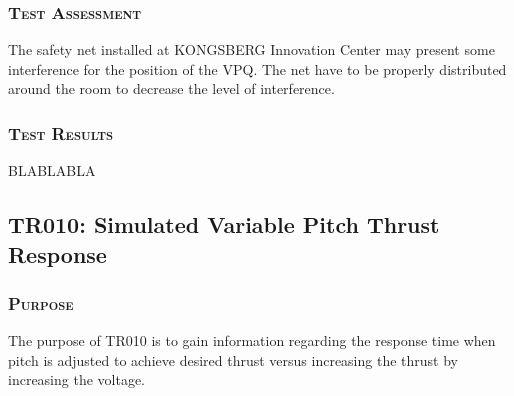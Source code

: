 \subsubsection*{\textsc{\medium Test Assessment}}
The safety net installed at KONGSBERG Innovation Center may present some interference for the position of the VPQ. The net have to be properly distributed around the room to decrease the level of interference.

\subsubsection*{\textsc{\medium Test Results}}
BLABLABLA


\newpage

\subsection{TR010: Simulated Variable Pitch Thrust Response}
         {}

\subsubsection*{\textsc{\medium Purpose}}
The purpose of TR010 is to gain information regarding the response time when pitch is adjusted to achieve desired thrust versus increasing the thrust by increasing the voltage.


